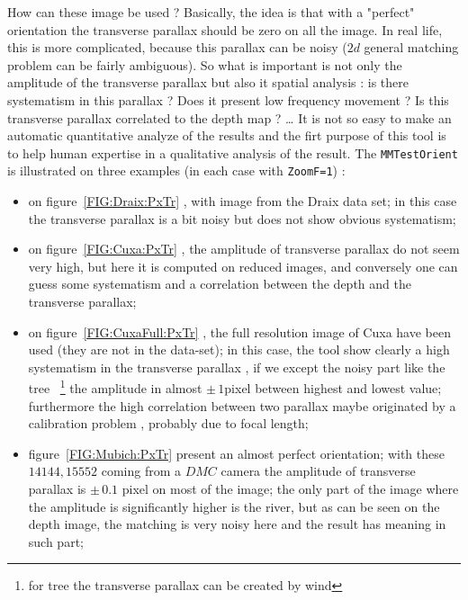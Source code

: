 How can these image be used ? Basically, the idea is that with a "perfect" orientation the
transverse parallax should be zero on all the image. In real life, this is more complicated, because this
parallax can be noisy ($2d$ general matching problem can be fairly ambiguous). So what is important is not
only the amplitude of the transverse parallax but also it spatial analysis : is there systematism in
this parallax ? Does it present low frequency movement ? Is this transverse parallax correlated to the
depth map ? \dots
It is not so easy to make an automatic quantitative analyze
of the results and the firt purpose of this tool is to help human expertise in a qualitative analysis of
the result.  The {\tt MMTestOrient} is illustrated on three examples (in each case with {\tt ZoomF=1}) :

\begin{itemize}
   \item on figure~\ref{FIG:Draix:PxTr} , with image from the Draix data set; in this case
          the transverse parallax is a bit noisy but does not show  obvious systematism;

   \item on figure~\ref{FIG:Cuxa:PxTr} , the amplitude of transverse parallax do not seem
         very high, but here it is computed on reduced images, and conversely one can guess
         some systematism and a correlation between the depth and the transverse parallax;

   \item on figure~\ref{FIG:CuxaFull:PxTr} ,  the full resolution image of Cuxa  have been
         used (they are not in the data-set); in this case, the tool show clearly a high systematism in
         the transverse parallax  , if we except the noisy part like the tree ~\footnote{for tree the
         transverse parallax can be created by wind} the amplitude in almost $\pm\,1$pixel
         between highest and lowest value; furthermore the high correlation between two parallax
         maybe originated by a calibration problem , probably due to focal length;

   \item figure~\ref{FIG:Mubich:PxTr} present an almost perfect orientation; with these $14144,15552$
         coming from a $DMC$ camera the amplitude of transverse parallax is $\pm\, 0.1$ pixel on most
         of the image; the only part of the image where the amplitude is significantly higher is
         the river, but as can be seen on the depth image, the matching is very noisy here and the
         result has meaning in such part;

\end{itemize}

